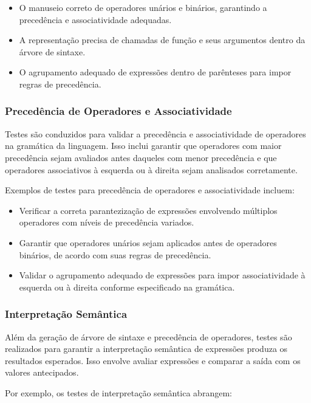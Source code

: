 \documentclass[english, 
               brazil, 
               bsc] %
               {dcomp-abntex2}
\begin{document}
\begin{itemize}
    \item O manuseio correto de operadores unários e binários, garantindo a precedência e associatividade adequadas.
    \item A representação precisa de chamadas de função e seus argumentos dentro da árvore de sintaxe.
    \item O agrupamento adequado de expressões dentro de parênteses para impor regras de precedência.
\end{itemize}

\subsubsection{Precedência de Operadores e Associatividade}

Testes são conduzidos para validar a precedência e associatividade de operadores na gramática da linguagem. Isso inclui garantir que operadores com maior precedência sejam avaliados antes daqueles com menor precedência e que operadores associativos à esquerda ou à direita sejam analisados corretamente.

Exemplos de testes para precedência de operadores e associatividade incluem:

\begin{itemize}
    \item Verificar a correta parantezização de expressões envolvendo múltiplos operadores com níveis de precedência variados.
    \item Garantir que operadores unários sejam aplicados antes de operadores binários, de acordo com suas regras de precedência.
    \item Validar o agrupamento adequado de expressões para impor associatividade à esquerda ou à direita conforme especificado na gramática.
\end{itemize}

\subsubsection{Interpretação Semântica}

Além da geração de árvore de sintaxe e precedência de operadores, testes são realizados para garantir a interpretação semântica de expressões produza os resultados esperados. Isso envolve avaliar expressões e comparar a saída com os valores antecipados.

Por exemplo, os testes de interpretação semântica abrangem:
\end{document}
